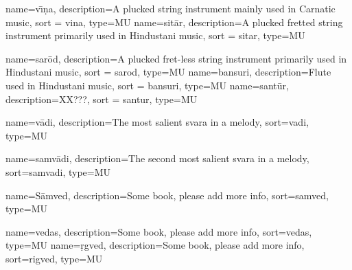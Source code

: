 
{
	name={v\={\i}\d{n}a},
	description={A plucked string instrument mainly used in Carnatic music},
	sort = vina,
	type=MU
}
{
	name={sit\={a}r},
	description={A plucked fretted string instrument primarily used in Hindustani music},
	sort = sitar,
	type=MU
}

{
	name={sar\={o}d},
	description={A plucked fret-less string instrument primarily used in Hindustani music},
	sort = sarod,
	type=MU
}
{
	name={bansuri},
	description={Flute used in Hindustani music},
	sort = bansuri,
	type=MU
}
{
	name={sant\={u}r},
	description={XX???},
	sort = santur,
	type=MU
}


	

	
	
{
	name={v\={a}di},
	description={The most salient svara in a melody},
	sort=vadi,
	type=MU
}

{
	name={samv\={a}di},
	description={The second most salient svara in a melody},
	sort=samvadi,
	type=MU
}

{
	name={S\={a}mved},
	description={Some book, please add more info},
	sort=samved,
	type=MU
}

{
	name={vedas},
	description={Some book, please add more info},
	sort=vedas,
	type=MU
}
{
	name={\d{r}gved},
	description={Some book, please add more info},
	sort=rigved,
	type=MU
}


